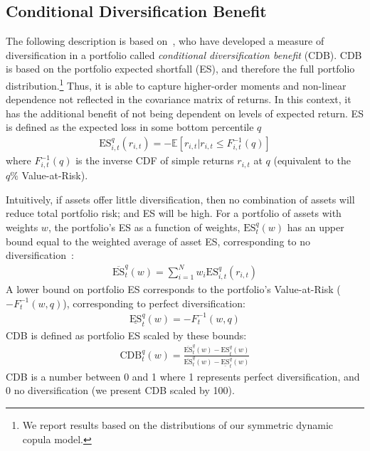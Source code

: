 
\subsection{Conditional Diversification Benefit} %
\label{sub:conditional_diversification_benefit}

The following description is based on~\textcite{ChristoffersenErrunzaJacobLanglois2012}, who have developed a measure of diversification in a portfolio called \emph{conditional diversification benefit} (CDB). CDB is based on the portfolio expected shortfall (ES), and therefore the full portfolio distribution.\footnote{We report results based on the distributions of our symmetric dynamic copula model.} Thus, it is able to capture higher-order moments and non-linear dependence not reflected in the covariance matrix of returns. In this context, it has the additional benefit of not being dependent on levels of expected return. ES is defined as the expected loss in some bottom percentile $q$
\begin{align}
    \text{ES}_{i,t}^q(r_{i,t}) = -\mathbb{E}[r_{i,t} | r_{i,t} \leq F_{i,t}^{-1}(q)]
\end{align}
where $F_{i,t}^{-1}(q)$ is the inverse CDF of simple returns $r_{i,t}$ at $q$ (equivalent to the $q\%$ Value-at-Risk). 

Intuitively, if assets offer little diversification, then no combination of assets will reduce total portfolio risk; and ES will be high. For a portfolio of assets with weights $w$, the portfolio's ES as a function of weights, $\text{ES}_t^q(w)$ has an upper bound equal to the weighted average of asset ES, corresponding to no diversification~\autocite{Artzner1999}:
\begin{align}
  \overline{\text{ES}}_t^q(w) = \sum_{i=1}^N w_i \text{ES}_{i,t}^q(r_{i,t})
\end{align}
A lower bound on portfolio ES corresponds to the portfolio's Value-at-Risk ($-F_{t}^{-1}(w, q)$), corresponding to perfect diversification:
\begin{align}
  \underline{\text{ES}}_t^q(w) = -F_{t}^{-1}(w, q)
\end{align}
CDB is defined as portfolio ES scaled by these bounds:
\begin{align}
  \text{CDB}_t^q(w) = \frac{\overline{\text{ES}}_t^q(w) - \text{ES}_t^q(w)}{\overline{\text{ES}}_t^q(w) - \underline{\text{ES}}_t^q(w)}
\end{align}
CDB is a number between 0 and 1 where 1 represents perfect diversification, and 0 no diversification (we present CDB scaled by 100).

